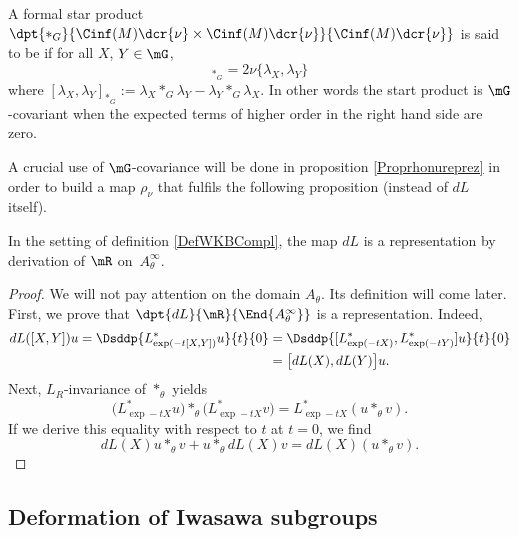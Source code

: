 \begin{definition}
A formal star product $\dpt{\ast_G}{\Cinf(M)\dcr{\nu}\times \Cinf(M)\dcr{\nu}}{\Cinf(M)\dcr{\nu}}$ is said to be  if for all $X$, $Y\in\mG$,
\begin{equation}
[\lambda_X,\lambda_Y]_{\ast_G}=2\nu\{\lambda_X,\lambda_Y\}
\end{equation}
where $[\lambda_{X},\lambda_{Y}]_{\ast_{G}}:=\lambda_X\ast_G\lambda_Y-\lambda_Y\ast_G\lambda_X$. In other words the start product is $\mG$-covariant when the expected terms of higher order in the right hand side are zero. 
\end{definition}

A crucial use of $\mG$-covariance will be done in proposition \ref{Proprhonureprez} in order to build a map $\rho_{\nu}$ that fulfils the following proposition (instead of $dL$ itself). 
\begin{proposition}
In the setting of definition \ref{DefWKBCompl}, the map $dL$ is a representation  by derivation of $\mR$  on~$ A_{\theta}^{\infty}$.
\label{prop:dL_reprez}
\end{proposition}

\begin{proof}
We will not pay attention on the domain $A_{\theta}$. Its definition will come later.  First, we prove that $\dpt{dL}{\mR}{\End{ A_{\theta}^{\infty}}}$ is a representation. Indeed,
\begin{equation}
\begin{split}
  dL([X,Y])u=\Dsddp{L^*_{\exp(-t[X,Y])}u}{t}{0}
            &=\Dsddp{ [ L^*_{\exp(-tX)},L^*_{\exp(-tY)}  ] u}{t}{0}\\
        &=\big[dL(X),dL(Y)\big]u.
\end{split}
\end{equation}
Next, $L_R$-invariance of $\ast_{\theta}$ yields 
\[ 
  \big( L^*_{\exp -tX}u \big)\ast_{\theta}\big( L^*_{\exp -tX}v \big)=L^*_{\exp -tX}(u\ast_{\theta} v).
\]
If we derive this equality with respect to $t$ at $t=0$, we find
\[
   dL(X)u\ast_{\theta} v+u\ast_{\theta} dL(X)v=dL(X)(u\ast_{\theta} v).
\]
\end{proof}

\subsection{Deformation of Iwasawa subgroups}   %

